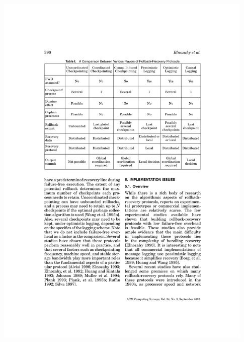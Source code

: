 \begin{frame}
\begin{center}
\includegraphics[width=0.93\textwidth]{table}
\end{center}
\end{frame}

\begin{RMFrame}

\BI
\item {}
\EI

\end{RMFrame}

